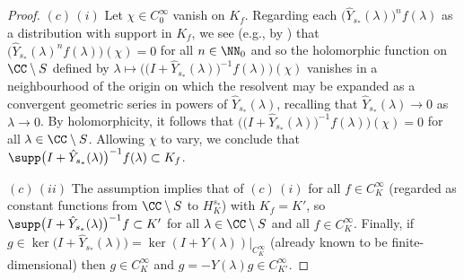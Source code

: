 \begin{proof}
 	$(c)$\,$(i)$ Let $\chi\in C_0^\infty$ vanish on $K_f$. Regarding each $\big(\hat{Y}_{s_*}(\lambda)\big)^{n}f(\lambda)$ as a distribution with support in $K_f$, we see (e.g., by \cite[Theorem 2.3.3]{Hormander1}) that
 	$\big(\hat{Y}_{s_*}(\lambda)^{n}f(\lambda)\big)(\chi)=0$ for all $n\in \NN_0$ and so the
 	holomorphic function on $\CC\setminus S$ defined by $\lambda\mapsto \big(\big(I+\hat{Y}_{s_*}(\lambda)\big)^{-1}f(\lambda)\big)(\chi)$ vanishes in a neighbourhood of the origin on which the resolvent may be expanded as a convergent geometric series in powers of $\hat{Y}_{s_*}(\lambda)$, recalling that $\hat{Y}_{s_*}(\lambda)\to 0$ as $\lambda\to 0$.
 	By holomorphicity, it follows that
 	$\big(\big(I+\hat{Y}_{s_*}(\lambda)\big)^{-1}f(\lambda)\big)(\chi)=0$ for all $\lambda\in\CC\setminus S$.
 	Allowing $\chi$ to vary, we conclude that $\supp \big(I+\hat{Y}_{s_*}(\lambda)\big)^{-1}f(\lambda)\subset K_f$.
 	
 	$(c)$\,$(ii)$ The assumption implies that of $(c)$\,$(i)$ for all $f\in C^\infty_K$ \big(regarded as constant functions from $\CC\setminus S$ to $H^{s_*}_K$\big) with $K_f=K'$, so
 	$\supp \big(I+\hat{Y}_{s_*}(\lambda)\big)^{-1}f\subset K'$ for all $\lambda\in \CC\setminus S$ and all $f\in C^\infty_K$. Finally,
 	if $g\in \ker \big(I+\hat{Y}_{s_*}(\lambda)\big)=\ker (I+ Y(\lambda))|_{C^\infty_K}$ (already known to be finite-dimensional) then $g\in C^\infty_K$ and $g=- Y(\lambda) g\in C^\infty_{K'}$.
 \end{proof}

